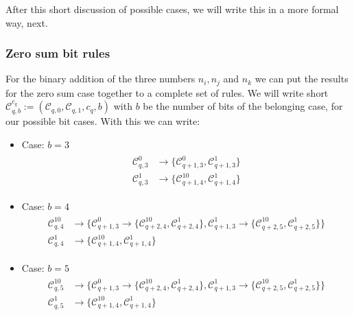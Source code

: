 \documentclass{article}
\newtheorem*{theorem A}{Theorem A}
\newtheorem*{theorem B}{N\"olker's Theorem}
\theoremstyle{remark}
\theoremstyle{remark}
\begin{document}
After this short discussion of possible cases, we will write this in a more formal way, next.
\subsubsection{Zero sum bit rules}
\label{sss:zerosumbitrules}
For the binary addition of the three numbers $n_{i}, n_{j}$ and $n_{k}$ we can put the results for the zero sum case together to a complete set of rules. We will write short $\mathcal{C}^{c_{q}}_{q,b} := \left(\mathcal{C}_{q,0}, \mathcal{C}_{q,1}, c_{q}, b\right)$ with $b$ be the number of bits of the belonging case, for our possible bit cases. With this we can write:

\begin{itemize}
    \item Case: $b = 3$
        \begin{align}
            \begin{split}
                \mathcal{C}^{0}_{q,3} &\rightarrow \{\mathcal{C}^{0}_{q+1,3}, \mathcal{C}^{1}_{q+1,3}\}\\
                \mathcal{C}^{1}_{q,3} &\rightarrow \{\mathcal{C}^{10}_{q+1,4}, \mathcal{C}^{1}_{q+1,4}\}
            \end{split}
        \label{eq:b3}
        \end{align}
    \item Case: $b = 4$
        \begin{align}
            \begin{split}
                \mathcal{C}^{10}_{q,4} &\rightarrow \{\mathcal{C}^{0}_{q+1,3} \rightarrow \{\mathcal{C}^{10}_{q+2,4}, \mathcal{C}^{1}_{q+2,4}\}, \mathcal{C}^{1}_{q+1,3} \rightarrow \{\mathcal{C}^{10}_{q+2,5}, \mathcal{C}^{1}_{q+2,5}\}\}\\
                \mathcal{C}^{1}_{q,4} &\rightarrow \{\mathcal{C}^{10}_{q+1,4}, \mathcal{C}^{1}_{q+1,4}\}
            \end{split}
        \label{eq:b4}
        \end{align}
    \item Case: $b = 5$
        \begin{align}
             \begin{split}
                \mathcal{C}^{10}_{q,5} &\rightarrow \{\mathcal{C}^{0}_{q+1,3} \rightarrow \{\mathcal{C}^{10}_{q+2,4}, \mathcal{C}^{1}_{q+2,4}\}, \mathcal{C}^{1}_{q+1,3} \rightarrow \{\mathcal{C}^{10}_{q+2,5}, \mathcal{C}^{1}_{q+2,5}\}\}\\
                \mathcal{C}^{1}_{q,5} &\rightarrow \{\mathcal{C}^{10}_{q+1,4}, \mathcal{C}^{1}_{q+1,4}\}
            \end{split}
        \label{eq:b5}
        \end{align}
\label{it:casesrules}
\end{itemize}
\end{document}
